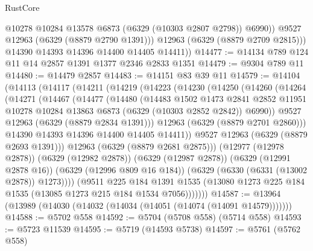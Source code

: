 \begin{lexlean}{RustCore}
\begin{coremodule}
                @10278
                @10284
                @13578
                @6873
                (@6329 (@10303 @2807 @2798))
                @6990))
            @9527
            @12963
            (@6329 (@8879 @2790 @1391)))
          @12963
          (@6329 (@8879 @2709 @2815)))
        @14390
        @14393
        @14396
        @14400
        @14405
        @14411))
@14477 := @14134 @789 @124 @11 @14 @2857 @1391 @1377 @2346 @2833 @1351
@14479 := @9304 @789 @11
@14480 := @14479 @2857
@14483 := @14151 @83 @39 @11
@14579 := @14104
    (@14113
      (@14117
        (@14211
          (@14219
            (@14223
              (@14230
                (@14250
                  (@14260
                    (@14264
                      (@14271
                        (@14467
                          (@14477
                            (@14480
                              (@14483
                                @1502
                                @1473
                                @2841
                                @2852
                                @11951
                                @10278
                                @10284
                                @13863
                                @6873
                                (@6329 (@10303 @2852 @2842))
                                @6990))
                            @9527
                            @12963
                            (@6329 (@8879 @2834 @1391)))
                          @12963
                          (@6329 (@8879 @2701 @2860)))
                        @14390
                        @14393
                        @14396
                        @14400
                        @14405
                        @14411))
                    @9527
                    @12963
                    (@6329 (@8879 @2693 @1391)))
                  @12963
                  (@6329 (@8879 @2681 @2875)))
                (@12977 (@12978 @2878))
                (@6329 (@12982 @2878))
                (@6329 (@12987 @2878))
                (@6329 (@12991 @2878 @16))
                (@6329 (@12996 @809 @16 @184))
                (@6329 (@6330 (@6331 (@13002 @2878)) @1273))))
            (@9511
              @225
              @184
              @1391
              @1535
              (@13080 @1273 @225 @184 @1535 (@13085 @1273 @215 @184 @1534 @7056)))))))
@14587 := @13964 (@13989 (@14030 (@14032 (@14034 (@14051 (@14074 (@14091 @14579)))))))
@14588 := @5702 @558
@14592 := @5704 (@5708 @558) (@5714 @558)
@14593 := @5723 @11539
@14595 := @5719 (@14593 @5738)
@14597 := @5761 (@5762 @558)

\end{coremodule}
\end{lexlean}
